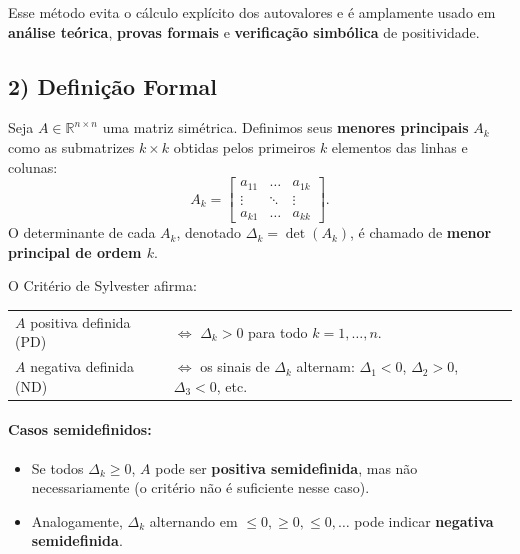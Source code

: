 \documentclass[9pt,a4paper]{extarticle}
\begin{document}
Esse m\'etodo evita o c\'alculo expl\'icito dos autovalores e \'e amplamente usado em \textbf{an\'alise te\'orica}, \textbf{provas formais} e \textbf{verifica\c c\~ao simb\'olica} de positividade.

\subsection*{2) Defini\c c\~ao Formal}
Seja $A \in \mathbb{R}^{n\times n}$ uma matriz sim\'etrica.  
Definimos seus \textbf{menores principais} $A_k$ como as submatrizes $k\times k$ obtidas pelos primeiros $k$ elementos das linhas e colunas:
\[
A_k = 
\begin{bmatrix}
a_{11} & \dots & a_{1k} \\
\vdots & \ddots & \vdots \\
a_{k1} & \dots & a_{kk}
\end{bmatrix}.
\]
O determinante de cada $A_k$, denotado $\Delta_k = \det(A_k)$, \'e chamado de \textbf{menor principal de ordem $k$}.

O Crit\'erio de Sylvester afirma:

\begin{center}
\begin{tabular}{ll}
$A$ positiva definida (PD) & $\iff$ $\Delta_k > 0$ para todo $k=1,\dots,n$.\\[3pt]
$A$ negativa definida (ND) & $\iff$ os sinais de $\Delta_k$ alternam: $\Delta_1 < 0$, $\Delta_2 > 0$, $\Delta_3 < 0$, etc.
\end{tabular}
\end{center}

\paragraph{Casos semidefinidos:}
\begin{itemize}
  \item Se todos $\Delta_k \ge 0$, $A$ pode ser \textbf{positiva semidefinida}, mas n\~ao necessariamente (o crit\'erio n\~ao \'e suficiente nesse caso).  
  \item Analogamente, $\Delta_k$ alternando em $\le 0, \ge 0, \le 0, \dots$ pode indicar \textbf{negativa semidefinida}.
\end{itemize}
\end{document}
